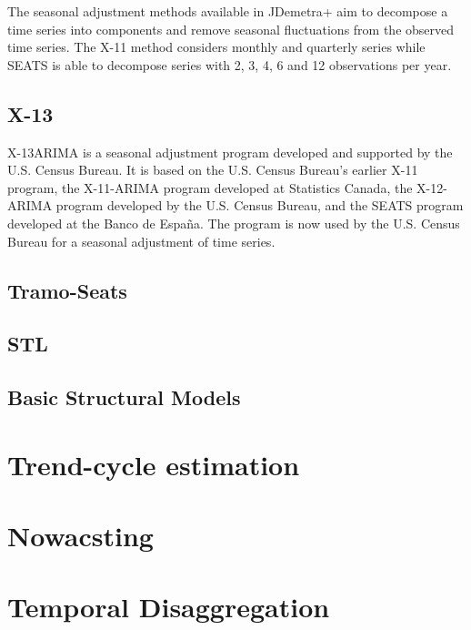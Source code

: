 \documentclass[
  letterpaper,
  DIV=11,
  numbers=noendperiod]{scrreprt}
\begin{document}
The seasonal adjustment methods available in JDemetra+ aim to decompose
a time series into components and remove seasonal fluctuations from the
observed time series. The X-11 method considers monthly and quarterly
series while SEATS is able to decompose series with 2, 3, 4, 6 and 12
observations per year.

\hypertarget{x-13}{%
\subsection{X-13}\label{x-13}}

X-13ARIMA is a seasonal adjustment program developed and supported by
the U.S. Census Bureau. It is based on the U.S. Census Bureau's earlier
X-11 program, the X-11-ARIMA program developed at Statistics Canada, the
X-12-ARIMA program developed by the U.S. Census Bureau, and the SEATS
program developed at the Banco de España. The program is now used by the
U.S. Census Bureau for a seasonal adjustment of time series.

\hypertarget{tramo-seats}{%
\subsection{Tramo-Seats}\label{tramo-seats}}

\hypertarget{stl}{%
\subsection{STL}\label{stl}}

\hypertarget{basic-structural-models}{%
\subsection{Basic Structural Models}\label{basic-structural-models}}

\hypertarget{trend-cycle-estimation}{%
\section{Trend-cycle estimation}\label{trend-cycle-estimation}}

\hypertarget{nowacsting}{%
\section{Nowacsting}\label{nowacsting}}

\hypertarget{temporal-disaggregation}{%
\section{Temporal Disaggregation}\label{temporal-disaggregation}}
\end{document}
